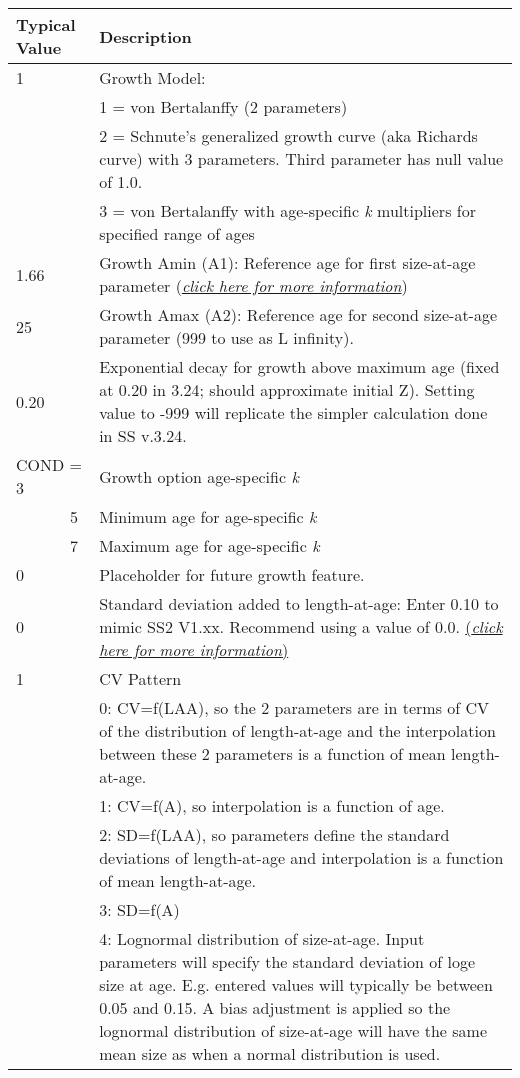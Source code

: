 	
\begin{longtable}{p{0.5cm} p{2cm} p{12cm}}
	   \multicolumn{2}{l}{Typical Value} & Description \\
	   \hline
	   1 & & Growth Model: \\
	     & & 1 = von Bertalanffy (2 parameters)\\
	     & & 2 = Schnute's generalized growth curve (aka Richards curve) with 3 parameters.  Third parameter has null value of 1.0. \\
	     & & 3 = von Bertalanffy with age-specific \textit{k} multipliers for specified range of ages\\
	   \hline

	   1.66 & & Growth Amin (A1): Reference age for first size-at-age parameter (\hyperlink{A1}{\textit{click here for more information}})\\
	   \hline

	   25 & & Growth Amax (A2): Reference age for second size-at-age parameter (999 to use as L infinity).\\
	   \hline
	   
	   0.20 & & Exponential decay for growth above maximum age (fixed at 0.20 in 3.24; should approximate initial Z).   Setting value to -999 will replicate the simpler calculation done in SS v.3.24.\\
	   \hline

	   \multicolumn{2}{l}{COND = 3} & Growth option age-specific \textit{k}\\
	   & 5 & Minimum age for age-specific \textit{k}\\
	   & 7 & Maximum age for age-specific \textit{k}\\
	   \hline
	    
	   0   & & Placeholder for future growth feature. \\
	   \hline

	   0 & & Standard deviation added to length-at-age: Enter 0.10 to mimic SS2 V1.xx. Recommend using a value of 0.0.  \hyperlink{A1}{(\textit{click here for more information})}\\
	   \hline
	   1 & & CV Pattern \\
	     & & 0: CV=f(LAA), so the 2 parameters are in terms of CV of the distribution of length-at-age and the interpolation between these 2 parameters is a function of mean length-at-age.\\
	     & & 1: CV=f(A), so interpolation is a function of age.\\
	     & & 2: SD=f(LAA), so parameters define the standard deviations of length-at-age and interpolation is a function of mean length-at-age.\\
	     & & 3: SD=f(A) \\
	     & & 4: Lognormal distribution of size-at-age.  Input parameters will specify the standard deviation of loge size at age.  E.g. entered values will typically be between 0.05 and 0.15.  A bias adjustment is applied so the lognormal distribution of size-at-age will have the same mean size as when a normal distribution is used.\\
	   \hline
	\end{longtable}

